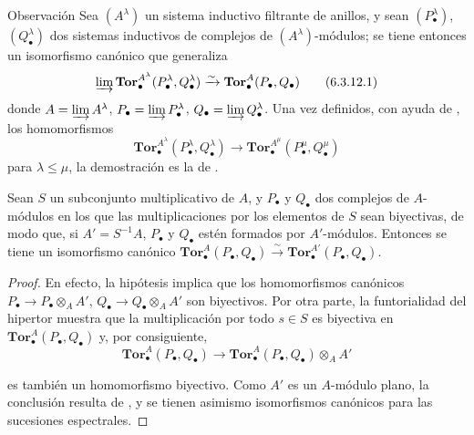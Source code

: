 \begin{namedtheorem}[6.3.12]{Observación}
\label{III.6.3.12}
Sea $(A^\lambda)$ un sistema inductivo filtrante de anillos, y sean
$(P_\bullet^\lambda)$, $(Q_\bullet^\lambda)$ dos sistemas inductivos de
complejos de $(A^\lambda)$-módulos; se tiene entonces un isomorfismo canónico
que generaliza 
\[
  \varinjlim
  \mathbf{Tor}_\bullet^{A^\lambda}
  (P_\bullet^\lambda,Q_\bullet^\lambda)
  \xrightarrow{\sim}
  \mathbf{Tor}_\bullet^A(P_\bullet,Q_\bullet)
  \tag{6.3.12.1}\label{III.6.3.12.1.fr}
\]
donde $A=\varinjlim A^\lambda$, $P_\bullet=\varinjlim P_\bullet^\lambda$,
$Q_\bullet=\varinjlim Q_\bullet^\lambda$. Una vez definidos, con ayuda de
, los homomorfismos
\[
  \mathbf{Tor}_\bullet^{A^\lambda}
  (P_\bullet^\lambda,Q_\bullet^\lambda)
  \longrightarrow
  \mathbf{Tor}_\bullet^{A^\mu}
  (P_\bullet^\mu,Q_\bullet^\mu)
\]
para $\lambda\leqslant\mu$, la demostración es la de .
\end{namedtheorem}

\begin{proposition}[6.3.13]
\label{III.6.3.13}
Sean $S$ un subconjunto multiplicativo de $A$, y $P_\bullet$ y $Q_\bullet$
dos complejos de $A$-módulos en los que las multiplicaciones por los
elementos de $S$ sean biyectivas, de modo que, si $A'=S^{-1}A$,
$P_\bullet$ y $Q_\bullet$ estén formados por $A'$-módulos. Entonces se tiene
un isomorfismo canónico
$\mathbf{Tor}_\bullet^A(P_\bullet,Q_\bullet)
\xrightarrow{\sim}
\mathbf{Tor}_\bullet^{A'}(P_\bullet,Q_\bullet)$.
\end{proposition}

\begin{proof}
En efecto, la hipótesis implica que los homomorfismos canónicos
$P_\bullet\to P_\bullet\otimes_A A'$,
$Q_\bullet\to Q_\bullet\otimes_A A'$ son biyectivos. Por otra parte, la
funtorialidad del hipertor muestra que la multiplicación por todo $s\in S$
es biyectiva en $\mathbf{Tor}_\bullet^A(P_\bullet,Q_\bullet)$ y, por
consiguiente,
\[
  \mathbf{Tor}_\bullet^A(P_\bullet,Q_\bullet)
  \longrightarrow
  \mathbf{Tor}_\bullet^A(P_\bullet,Q_\bullet)\otimes_A A'
\]


es también un homomorfismo biyectivo. Como $A'$ es un $A$-módulo plano, la
conclusión resulta de , y se tienen asimismo isomorfismos
canónicos
para las sucesiones espectrales.
\end{proof}
